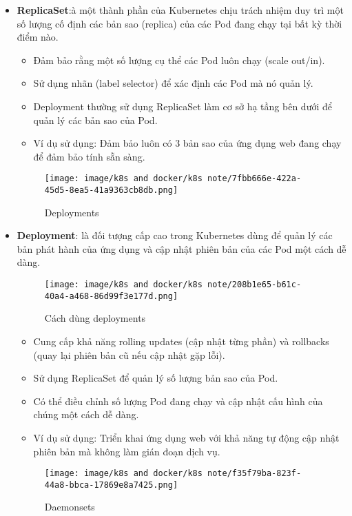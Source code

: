 \documentclass[a4paper,12pt]{article}
\begin{document}
\begin{itemize}
    \item \textbf{ReplicaSet}:à một thành phần của Kubernetes chịu trách nhiệm duy trì một số lượng cố định các bản sao (replica) của các Pod đang chạy tại bất kỳ thời điểm nào.
    \begin{itemize}
        \item Đảm bảo rằng một số lượng cụ thể các Pod luôn chạy (scale out/in).
        \item Sử dụng nhãn (label selector) để xác định các Pod mà nó quản lý.
        \item Deployment thường sử dụng ReplicaSet làm cơ sở hạ tầng bên dưới để quản lý các bản sao của Pod.
        \item Ví dụ sử dụng: Đảm bảo luôn có 3 bản sao của ứng dụng web đang chạy để đảm bảo tính sẵn sàng.
    \end{itemize}

\begin{figure}[htbp]
    \centering
    \texttt{[image: image/k8s and docker/k8s note/7fbb666e-422a-45d5-8ea5-41a9363cb8db.png]}
    \caption{Deployments}
    \label{}
\end{figure}

    
    \item \textbf{Deployment}: là đối tượng cấp cao trong Kubernetes dùng để quản lý các bản phát hành của ứng dụng và cập nhật phiên bản của các Pod một cách dễ dàng.
    \begin{figure}[htbp]
    \centering
    \texttt{[image: image/k8s and docker/k8s note/208b1e65-b61c-40a4-a468-86d99f3e177d.png]}
    \caption{Cách dùng deployments}
    \label{}
\end{figure}

    \begin{itemize}
        \item Cung cấp khả năng rolling updates (cập nhật từng phần) và rollbacks (quay lại phiên bản cũ nếu cập nhật gặp lỗi).
        \item Sử dụng ReplicaSet để quản lý số lượng bản sao của Pod.
        \item Có thể điều chỉnh số lượng Pod đang chạy và cập nhật cấu hình của chúng một cách dễ dàng.
        \item Ví dụ sử dụng: Triển khai ứng dụng web với khả năng tự động cập nhật phiên bản mà không làm gián đoạn dịch vụ.
    \end{itemize}



\begin{figure}[htbp]
    \centering
    \texttt{[image: image/k8s and docker/k8s note/f35f79ba-823f-44a8-bbca-17869e8a7425.png]}
    \caption{Daemonsets}
    \label{}
\end{figure}






\end{itemize}
\end{document}
